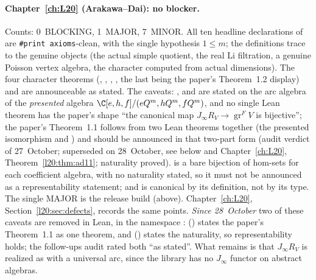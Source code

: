 \paragraph{Chapter~\ref{ch:L20} (Arakawa--Dai): no blocker.} Counts: 0~BLOCKING, 1~MAJOR, 7~MINOR. All ten headline
declarations of  are \texttt{\#print axioms}-clean, with the single
hypothesis $1\le m$; the definitions trace to the genuine objects (the actual simple quotient, the real Li filtration, a
genuine Poisson vertex algebra, the character computed from actual dimensions). The four character theorems
(, , ,
, the last being the paper's Theorem~1.2 display) and
 are announceable as stated. The caveats: ,
 and  are stated on the arc algebra of the \emph{presented} algebra
$\C[e,h,f]/(eQ^m,hQ^m,fQ^m)$, and no single Lean theorem has the paper's shape ``the canonical map
$J_\infty R_V\to\operatorname{gr}^FV$ is bijective''; the paper's Theorem~1.1 follows from two Lean theorems together
(the presented isomorphism and ) and should be announced in that two-part form (audit verdict of
27~October; superseded on 28~October, see below and Chapter~\ref{ch:L20}, Theorem~\ref{l20:thm:ad11}; naturality proved).
 is a bare bijection of hom-sets for each coefficient algebra, with no naturality stated, so it
must not be announced as a representability statement; and  is canonical by its definition, not by
its type. The single MAJOR is the release build (above). Chapter~\ref{ch:L20}, Section~\ref{l20:sec:defects}, records the
same points. \emph{Since 28~October} two of these caveats are removed in Lean, in the namespace
: 
() states the paper's Theorem~1.1 as one theorem, and
 () states the naturality, so
representability holds; the follow-ups audit rated both ``as stated''. What remains is that $J_\infty R_V$ is realized
as  with a universal arc, since the library has no $J_\infty$ functor on abstract algebras.

